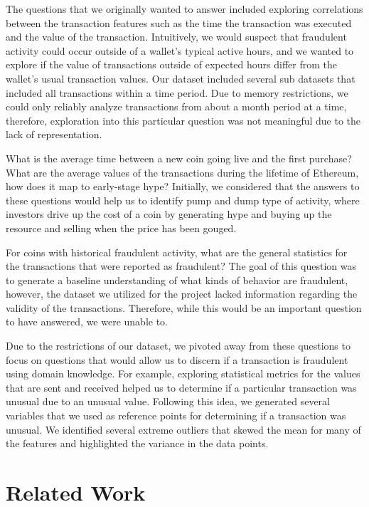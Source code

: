 \documentclass[sigconf]{acmart}
\begin{document}
The questions that we originally wanted to answer included exploring correlations between the transaction features such as the time the transaction was executed and the value of the transaction. Intuitively, we would suspect that fraudulent activity could occur outside of a wallet’s typical active hours, and we wanted to explore if the value of transactions outside of expected hours differ from the wallet’s usual transaction values. Our dataset included several sub datasets that included all transactions within a time period. Due to memory restrictions, we could only reliably analyze transactions from about a month period at a time, therefore, exploration into this particular question was not meaningful due to the lack of representation. 

What is the average time between a new coin going live and the first purchase? What are the average values of the transactions during the lifetime of Ethereum, how does it map to early-stage hype? Initially, we considered that the answers to these questions would help us to identify pump and dump type of activity, where investors drive up the cost of a coin by generating hype and buying up the resource and selling when the price has been gouged.  

For coins with historical fraudulent activity, what are the general statistics for the transactions that were reported as fraudulent? The goal of this question was to generate a baseline understanding of what kinds of behavior are fraudulent, however, the dataset we utilized for the project lacked information regarding the validity of the transactions. Therefore, while this would be an important question to have answered, we were unable to. 

Due to the restrictions of our dataset, we pivoted away from these questions to focus on questions that would allow us to discern if a transaction is fraudulent using domain knowledge.  For example, exploring statistical metrics for the values that are sent and received helped us to determine if a particular transaction was unusual due to an unusual value. Following this idea, we generated several variables that we used as reference points for determining if a transaction was unusual. We identified several extreme outliers that skewed the mean for many of the features and highlighted the variance in the data points. 

\section{Related Work}
\end{document}
